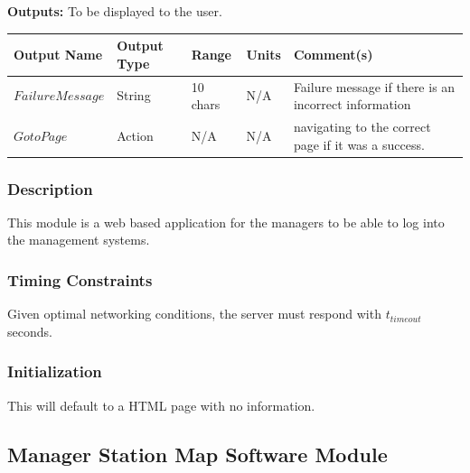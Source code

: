\documentclass [10pt]{article}
\begin{document}
\textbf{Outputs: } To be displayed to the user.\newline
\begin{longtable}{|l|l|l|l|l|}\hline 
	\rowcolor{tableCell}\textbf{Output Name} & \textbf{Output Type} & \textbf{Range} & \textbf{Units} & \textbf{Comment(s)} \\ \hline
	$  FailureMessage $ & String & 10 chars & N/A & Failure message if there is an incorrect information  \\ \hline
	\rowcolor{tableCell}$  GotoPage $ & Action & N/A  & N/A & navigating to the correct page if it was a success. \\ \hline
\end{longtable}


\subsubsection{Description}
This module is a web based application for the managers to be able to log into the management systems.


\subsubsection{Timing Constraints}
Given optimal networking conditions, the server must respond with $ t_{timeout} $ seconds.


\subsubsection{Initialization}
This will default to a HTML page with no information.


\subsection{Manager Station Map Software Module}
\end{document}
